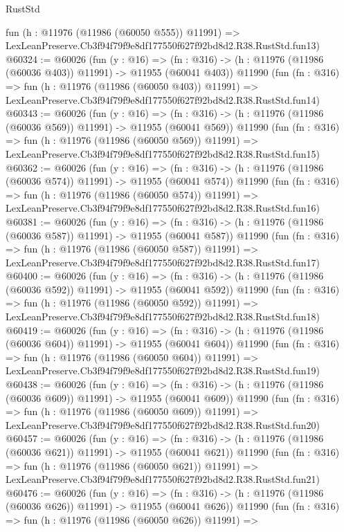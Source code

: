 \begin{lexlean}{RustStd}
\begin{coremodule}
    fun (h : @11976 (@11986 (@60050 @555)) @11991) =>
    LexLeanPreserve.Cb3f94f79f9e8df177550f627f92bd8d2.R38.RustStd.fun13)
@60324 := @60026
    (fun (y : @16) =>
    (fn : @316) -> (h : @11976 (@11986 (@60036 @403)) @11991) -> @11955 (@60041 @403))
    @11990
    (fun (fn : @316) =>
    fun (h : @11976 (@11986 (@60050 @403)) @11991) =>
    LexLeanPreserve.Cb3f94f79f9e8df177550f627f92bd8d2.R38.RustStd.fun14)
@60343 := @60026
    (fun (y : @16) =>
    (fn : @316) -> (h : @11976 (@11986 (@60036 @569)) @11991) -> @11955 (@60041 @569))
    @11990
    (fun (fn : @316) =>
    fun (h : @11976 (@11986 (@60050 @569)) @11991) =>
    LexLeanPreserve.Cb3f94f79f9e8df177550f627f92bd8d2.R38.RustStd.fun15)
@60362 := @60026
    (fun (y : @16) =>
    (fn : @316) -> (h : @11976 (@11986 (@60036 @574)) @11991) -> @11955 (@60041 @574))
    @11990
    (fun (fn : @316) =>
    fun (h : @11976 (@11986 (@60050 @574)) @11991) =>
    LexLeanPreserve.Cb3f94f79f9e8df177550f627f92bd8d2.R38.RustStd.fun16)
@60381 := @60026
    (fun (y : @16) =>
    (fn : @316) -> (h : @11976 (@11986 (@60036 @587)) @11991) -> @11955 (@60041 @587))
    @11990
    (fun (fn : @316) =>
    fun (h : @11976 (@11986 (@60050 @587)) @11991) =>
    LexLeanPreserve.Cb3f94f79f9e8df177550f627f92bd8d2.R38.RustStd.fun17)
@60400 := @60026
    (fun (y : @16) =>
    (fn : @316) -> (h : @11976 (@11986 (@60036 @592)) @11991) -> @11955 (@60041 @592))
    @11990
    (fun (fn : @316) =>
    fun (h : @11976 (@11986 (@60050 @592)) @11991) =>
    LexLeanPreserve.Cb3f94f79f9e8df177550f627f92bd8d2.R38.RustStd.fun18)
@60419 := @60026
    (fun (y : @16) =>
    (fn : @316) -> (h : @11976 (@11986 (@60036 @604)) @11991) -> @11955 (@60041 @604))
    @11990
    (fun (fn : @316) =>
    fun (h : @11976 (@11986 (@60050 @604)) @11991) =>
    LexLeanPreserve.Cb3f94f79f9e8df177550f627f92bd8d2.R38.RustStd.fun19)
@60438 := @60026
    (fun (y : @16) =>
    (fn : @316) -> (h : @11976 (@11986 (@60036 @609)) @11991) -> @11955 (@60041 @609))
    @11990
    (fun (fn : @316) =>
    fun (h : @11976 (@11986 (@60050 @609)) @11991) =>
    LexLeanPreserve.Cb3f94f79f9e8df177550f627f92bd8d2.R38.RustStd.fun20)
@60457 := @60026
    (fun (y : @16) =>
    (fn : @316) -> (h : @11976 (@11986 (@60036 @621)) @11991) -> @11955 (@60041 @621))
    @11990
    (fun (fn : @316) =>
    fun (h : @11976 (@11986 (@60050 @621)) @11991) =>
    LexLeanPreserve.Cb3f94f79f9e8df177550f627f92bd8d2.R38.RustStd.fun21)
@60476 := @60026
    (fun (y : @16) =>
    (fn : @316) -> (h : @11976 (@11986 (@60036 @626)) @11991) -> @11955 (@60041 @626))
    @11990
    (fun (fn : @316) =>
    fun (h : @11976 (@11986 (@60050 @626)) @11991) =>

\end{coremodule}
\end{lexlean}
